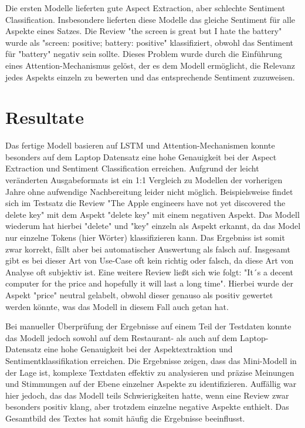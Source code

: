 \documentclass[12pt]{article}
\begin{document}
\newline
\newline
Die ersten Modelle lieferten gute Aspect Extraction, aber schlechte Sentiment Classification. Insbesondere lieferten diese Modelle das gleiche Sentiment 
für alle Aspekte eines Satzes. Die Review "the screen is great but I hate the battery" wurde als "screen: positive; battery: positive" 
klassifiziert, obwohl das Sentiment für "battery" negativ sein sollte. Dieses Problem wurde durch die Einführung eines Attention-Mechanismus gelöst, 
der es dem Modell ermöglicht, die Relevanz jedes Aspekts einzeln zu bewerten und das entsprechende Sentiment zuzuweisen.

\section{Resultate}

Das fertige Modell basieren auf LSTM und Attention-Mechanismen konnte besonders auf dem Laptop Datensatz eine hohe Genauigkeit bei der Aspect Extraction und Sentiment Classification erreichen. Aufgrund der leicht veränderten Ausgabeformats ist ein 1:1 Vergleich zu Modellen der vorherigen Jahre ohne aufwendige Nachbereitung leider nicht möglich. Beispielsweise findet sich im Testsatz die Review "The Apple engineers have not yet discovered the delete key" mit dem Aspekt "delete key" mit einem negativen Aspekt. Das Modell wiederum hat hierbei "delete" und "key" einzeln als Aspekt erkannt, da das Model nur einzelne Tokens (hier Wörter) klassifizieren kann. Das Ergebniss ist somit zwar korrekt, fällt aber bei automatischer Auswertung als falsch auf.
Insgesamt gibt es bei dieser Art von Use-Case oft kein richtig oder falsch, da diese Art von Analyse oft subjektiv ist. Eine weitere Review ließt sich wie folgt: "It´s a decent computer for the price and hopefully it will last a long time". Hierbei wurde der Aspekt "price" neutral gelabelt, obwohl dieser genauso als positiv gewertet werden könnte, was das Modell in diesem Fall auch getan hat.

Bei manueller Überprüfung der Ergebnisse auf einem Teil der Testdaten konnte das Modell jedoch sowohl auf dem Restaurant- als auch auf dem Laptop-Datensatz eine hohe Genauigkeit bei der Aspektextraktion und Sentimentklassifikation erreichen. Die Ergebnisse zeigen, dass das Mini-Modell in der Lage ist, komplexe Textdaten effektiv zu analysieren und präzise Meinungen und Stimmungen auf der Ebene einzelner Aspekte zu identifizieren. Auffällig war hier jedoch, das das Modell teils Schwierigkeiten hatte, wenn eine Review zwar besonders positiv klang, aber trotzdem einzelne negative Aspekte enthielt. Das Gesamtbild des Textes hat somit häufig die Ergebnisse beeinflusst.
\end{document}
